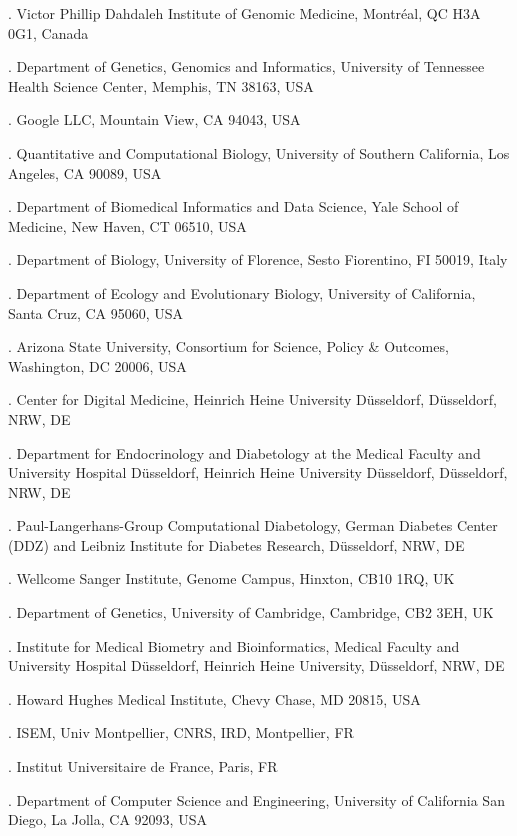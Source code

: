 \documentclass[pdflatex,mathphys]{jnl}
\begin{document}
{. Victor Phillip Dahdaleh Institute of Genomic Medicine, Montr\'eal, QC H3A 0G1, Canada\par
{}. Department of Genetics, Genomics and Informatics, University of Tennessee Health Science Center, Memphis, TN 38163, USA\par
{}. Google LLC, Mountain View, CA 94043, USA\par
{}. Quantitative and Computational Biology, University of Southern California, Los Angeles, CA 90089, USA\par
{}. Department of Biomedical Informatics and Data Science, Yale School of Medicine, New Haven, CT 06510, USA\par
{}. Department of Biology, University of Florence, Sesto Fiorentino, FI 50019, Italy\par
{}. Department of Ecology and Evolutionary Biology, University of California, Santa Cruz, CA 95060, USA\par
{}. Arizona State University, Consortium for Science, Policy \& Outcomes, Washington, DC 20006, USA\par
{}. Center for Digital Medicine, Heinrich Heine University D\"usseldorf, D\"usseldorf, NRW, DE\par
{}. Department for Endocrinology and Diabetology at the Medical Faculty and University Hospital D\"usseldorf, Heinrich Heine University D\"usseldorf, D\"usseldorf, NRW, DE\par
{}. Paul-Langerhans-Group Computational Diabetology, German Diabetes Center (DDZ) and Leibniz Institute for Diabetes Research, D\"usseldorf, NRW, DE\par
{}. Wellcome Sanger Institute, Genome Campus, Hinxton, CB10 1RQ, UK\par
{}. Department of Genetics, University of Cambridge, Cambridge, CB2 3EH, UK\par
{}. Institute for Medical Biometry and Bioinformatics, Medical Faculty and University Hospital D\"usseldorf, Heinrich Heine University, D\"usseldorf, NRW, DE\par
{}. Howard Hughes Medical Institute, Chevy Chase, MD 20815, USA\par
{}. ISEM, Univ Montpellier, CNRS, IRD, Montpellier, FR\par
{}. Institut Universitaire de France, Paris, FR\par
{}. Department of Computer Science and Engineering, University of California San Diego, La Jolla, CA 92093, USA\par
}
\end{document}

